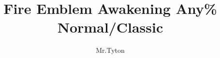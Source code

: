 \documentclass[a4paper]{report}
\title{Fire Emblem Awakening Any\% Normal/Classic}
\author{Mr.Tyton}
\begin{document}
\singlespacing
\maketitle
\makeatletter
\patchcmd{\chapter}{\if@openright\cleardoublepage\else\clearpage\fi}{}{}{}
\makeatother


\newenvironment{battlespecial}[1]{\begin{tcolorbox}[title=\begin{center}#1\end{center},colbacktitle=red!50!white]}{\end{tcolorbox}}
\newenvironment{battle}[1]{\refstepcounter{chaptercount} \begin{tcolorbox}[title=\begin{center}Chapter \thechaptercount\ - #1\end{center},colbacktitle=red!50!white]}{\end{tcolorbox}}


\newcommand{\battleinfo}[3]{Goal: \ifthenelse{\equal{#1}{rout}}{Rout the Enemy}{\ifthenelse{\equal{#1}{commander}}{Defeat the Commander}{#1}} \newline Turns: #2 \newline Units: #3}


\newenvironment{shop}[1]{\begin{tcolorbox}[title=\begin{center}SHOP\, #1 GOLD\end{center},colbacktitle=OliveGreen!50!white]}{\end{tcolorbox}}

\newcommand{\cs}[1][]{\textbf{CS}%
	\ifthenelse{\isempty{#1}}{}{ (#1)}%
}


\newcommand{\robin}{\textbf{\textcolor{purple}{Robin}}}
\newcommand{\anna}{\textbf{\textcolor{green}{Anna}}}
\newcommand{\chrom}{\textbf{\textcolor{blue}{Chrom}}}
\newcommand{\lucina}{\textbf{\textcolor{cyan}{Lucina}}}
\newcommand{\frederick}{\textbf{\textcolor{gray}{Frederick}}}
\newcommand{\sully}{\textbf{\textcolor{BrickRed}{Sully}}}
\newcommand{\cordelia}{\textbf{\textcolor{Mahogany}{Cordelia}}}
\newcommand{\ricken}{\textbf{\textcolor{Emerald}{Ricken}}}
\newcommand{\nowi}{\textbf{\textcolor{SpringGreen}{Nowi}}}
\newcommand{\olivia}{\textbf{\textcolor{Magenta}{Olivia}}}
\newcommand{\cherche}{\textbf{\textcolor{Maroon}{Cherche}}}
\newcommand{\sayri}{\textbf{\textcolor{PineGreen}{Say'ri}}}
\newcommand{\basilio}{\textbf{\textcolor{brown}{Basilio}}}
\newcommand{\flavia}{\textbf{\textcolor{RawSienna}{Flavia}}}
\newcommand{\enemy}[1]{\textbf{\textcolor{red}{#1}}}
\end{document}
